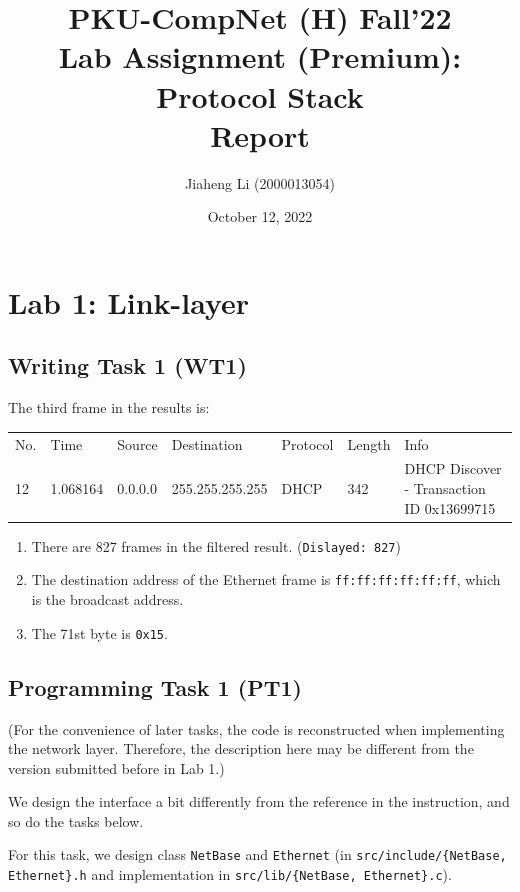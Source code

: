 \documentclass[a4paper]{article}
\title{PKU-CompNet (H) Fall'22 \\ Lab Assignment (Premium): Protocol Stack \\ Report}
\author{Jiaheng Li (2000013054)}
\date{October 12, 2022}
\begin{document}
  \maketitle

  \tableofcontents

  \section{Lab 1: Link-layer}

  \subsection{Writing Task 1 (WT1)}

  The third frame in the results is:
  \begin{table}[!ht]
    \centering
    \fontsize{8pt}{8pt}
    \ttfamily
    \begin{tabular}{lllllll}
      No. & Time & Source & Destination & Protocol & Length & Info \\
      12 & 1.068164 & 0.0.0.0 & 255.255.255.255 & DHCP & 342 & DHCP Discover - Transaction ID 0x13699715
    \end{tabular}
  \end{table}

  \begin{enumerate}
    \item There are 827 frames in the filtered result. (\texttt{Dislayed: 827})
    \item The destination address of the Ethernet frame is \texttt{ff:ff:ff:ff:ff:ff}, which is the broadcast address.
    \item The 71st byte is \texttt{0x15}.
  \end{enumerate}

  \subsection{Programming Task 1 (PT1)}

  (For the convenience of later tasks, the code is reconstructed when implementing the network layer. Therefore, the description here may be different from the version submitted before in Lab 1.)

  We design the interface a bit differently from the reference in the instruction, and so do the tasks below.

  For this task, we design class \texttt{NetBase} and \texttt{Ethernet} (in \texttt{src/include/\{NetBase, Ethernet\}.h} and implementation in \texttt{src/lib/\{NetBase, Ethernet\}.c}).
\end{document}
